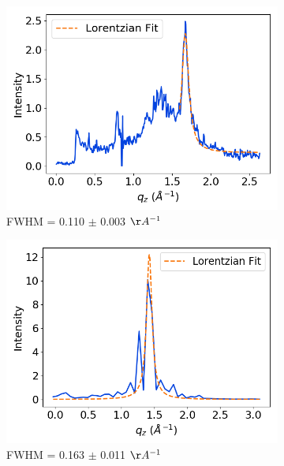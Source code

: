 \documentclass[journal=jpcbfk,manuscript=article]{achemso}
\begin{document}
\begin{figure}
\begin{subfigure}{0.45\textwidth}
  \includegraphics[width=\textwidth]{exp_zsection_fit.png}
  \caption{FWHM = 0.110 $\pm$ 0.003 $\AA^{-1}$}\label{fig:exp_zsection_fit}
  \end{subfigure}
  \begin{subfigure}{0.45\textwidth}
  \includegraphics[width=\textwidth]{sim_zsection_fit.png}
  \caption{FWHM = 0.163 $\pm$ 0.011 $\AA^{-1}$}\label{fig:sim_zsection_fit}
  \end{subfigure}
  \caption{
}
\end{figure}
\end{document}
